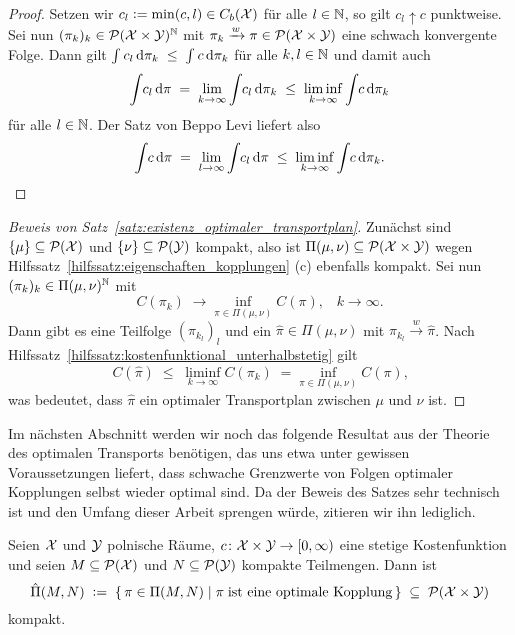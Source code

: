 \documentclass[../thesis/thesis.tex]{subfiles}
\begin{document}
	\begin{proof}
		Setzen wir $c_l \vcentcolon = \min(c, l) \in C_b(\mathcal{X})$ für alle $l \in \mathbb{N}$, so gilt $c_l \uparrow c$ punktweise. Sei nun $(\pi_k)_k \in \mathcal{P}(\mathcal{X} \times \mathcal{Y})^{\mathbb{N}}$ mit $\pi_k \xrightarrow{w} \pi \in \mathcal{P}(\mathcal{X} \times \mathcal{Y})$ eine schwach konvergente Folge. Dann gilt
		$\int_{} \, c_l \, \mathrm{d}\pi_k \; \leq \; \int_{} \, c \, \mathrm{d}\pi_k$ für alle $k, l \in \mathbb{N}$ und damit auch 
		\[ \int_{} \, c_l \, \mathrm{d}\pi \; = \; \lim_{k \to \infty} \int_{} \, c_l \, \mathrm{d}\pi_k \; \leq \; \liminf_{k \to \infty} \int_{} \, c \, \mathrm{d}\pi_k \]
		für alle $l \in \mathbb{N}$. Der Satz von Beppo Levi liefert also
		\[ \int_{} \, c \, \mathrm{d}\pi \; = \; \lim_{l \to \infty} \int_{} \, c_l \, \mathrm{d}\pi \; \leq \; \liminf_{k \to \infty} \int_{} \, c \, \mathrm{d}\pi_k \text{.} \qedhere \]
	\end{proof}

	\begin{proof}[Beweis von Satz~\ref{satz:existenz_optimaler_transportplan}]
		Zunächst sind $\left\{\mu\right\} \subseteq \mathcal{P}(\mathcal{X})$ und $\left\{\nu\right\} \subseteq \mathcal{P}(\mathcal{Y})$ kompakt, also ist $\Pi(\mu, \nu) \subseteq \mathcal{P}(\mathcal{X} \times \mathcal{Y})$ 
		wegen Hilfssatz~\ref{hilfssatz:eigenschaften_kopplungen} (c) ebenfalls kompakt.
		Sei nun $(\pi_k)_k \in \Pi(\mu, \nu)^{\mathbb{N}}$ mit
		\[ C(\pi_k) \; \to \inf_{\pi \in \Pi(\mu, \nu)} C(\pi) \text{,} \quad k \to \infty \text{.} \]
		Dann gibt es eine Teilfolge $(\pi_{k_l})_l$ und ein $\hat{\pi} \in \Pi(\mu, \nu)$ mit $\pi_{k_l} \xrightarrow{w} \hat{\pi}$. Nach Hilfssatz~\ref{hilfssatz:kostenfunktional_unterhalbstetig} gilt
		\[ C(\hat{\pi}) \; \leq \; \liminf_{k \to \infty} C(\pi_k) \; = \inf_{\pi \in \Pi(\mu, \nu)} C(\pi) \text{,} \]
		was bedeutet, dass $\hat{\pi}$ ein optimaler Transportplan zwischen $\mu$ und $\nu$ ist. 
	\end{proof}

	Im nächsten Abschnitt werden wir noch das folgende Resultat aus der Theorie des optimalen Transports benötigen, das uns etwa unter gewissen Voraussetzungen liefert, dass schwache Grenzwerte von Folgen optimaler
	Kopplungen selbst wieder optimal sind. Da der Beweis des Satzes sehr technisch ist und den Umfang dieser Arbeit sprengen würde, zitieren wir ihn lediglich.

	\begin{Satz}
		\label{satz:optimale_transportpläne_kompakt}
		Seien $\mathcal{X}$ und $\mathcal{Y}$ polnische Räume, $c \colon \mathcal{X} \times \mathcal{Y} \to [0, \infty)$ eine stetige Kostenfunktion und seien $M \subseteq \mathcal{P}(\mathcal{X})$ und $N \subseteq \mathcal{P}(\mathcal{Y})$ kompakte Teilmengen.
		Dann ist 
		\[ \hat{\Pi}(M, N) \; \vcentcolon = \; \left\{\, \pi \in \Pi(M, N) \; \middle| \; \pi \; \text{ist eine optimale Kopplung} \,\right\} \; \subseteq \; \mathcal{P}(\mathcal{X} \times \mathcal{Y}) \]
		kompakt.
	\end{Satz}
\end{document}

